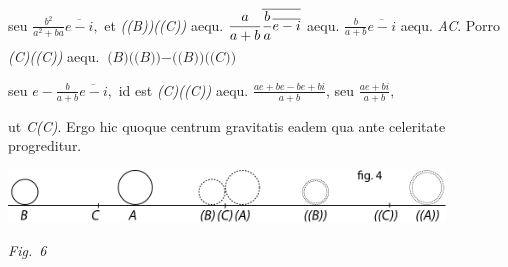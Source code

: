 \rule[-4mm]{0mm}{10mm}
seu $\displaystyle\frac{b^2}{a^2+ba}\overline{e-i},$
et \textit{((B))((C))} aequ. $\displaystyle\frac{a}{a+b}%
\rule[-4mm]{0mm}{10mm}
\overline{\displaystyle\frac{b}{a}\overline{e-i}}$
aequ. $\displaystyle\frac{b}{a+b}\overline{e-i}$
aequ. \textit{AC}.
Porro \textit{(C)((C))} aequ. $\textit{(B)((B))} - \textit{((B))((C))}$%
\rule[-4mm]{0mm}{10mm}
seu $e-\displaystyle\frac{b}{a+b}\overline{e-i},$
id est \textit{(C)((C))} aequ. $\displaystyle\frac{ae + be-be + bi}{a+b}$,
seu $\displaystyle\frac{ae + bi}{a+b},$%
\rule[-4mm]{0mm}{10mm}
ut
%
%
\textit{C(C)}.
Ergo hic quoque centrum gravitatis\protect{}
eadem qua ante celeritate progreditur.%
\protect{}%
\protect{}%
\rule[-4mm]{0mm}{8mm}%
\pend%
\count{}%
\count{}%
\count{}%
%
  \vspace{2.5em}%
  \centerline{\includegraphics[width=0.87\textwidth]{gesamttex/edit_VIII,3/images/LH_35_09_23_001-002_d6.pdf}}%
  \vspace*{0.5em}
  \centerline{\lbrack\textit{Fig.~6}\rbrack}%
  \label{LH_35_09_23_001-002_Fig.6}%
%
%
